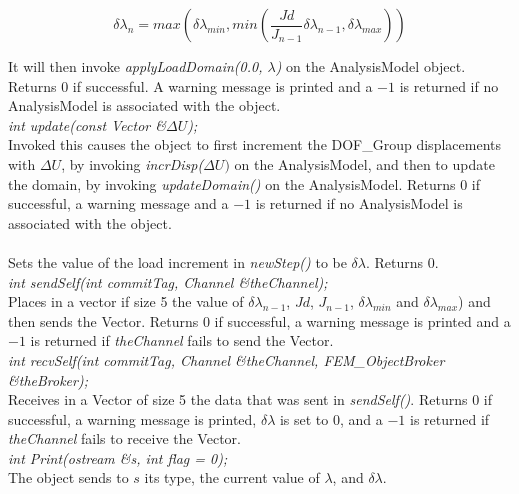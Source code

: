 \[ 
\delta \lambda_n = max \left( \delta \lambda_{min}, min \left(
\frac{Jd}{J_{n-1}} \delta \lambda_{n-1}, \delta \lambda_{max} \right) \right)
\]

\noindent It will then invoke
{\em applyLoadDomain(0.0, $\lambda$)} on the AnalysisModel
object. Returns $0$ if successful. A warning message is printed and a
$-1$ is returned if no AnalysisModel is associated with the object. \\

{\em int update(const Vector \&$\Delta U$);} \\
Invoked this causes the object to first increment the DOF\_Group
displacements with $\Delta U$, by invoking {\em incrDisp($\Delta U)$}
on the AnalysisModel, and then to update the domain, by invoking {\em
updateDomain()} on the AnalysisModel. Returns $0$ if successful, a
warning message and a $-1$ is returned if no AnalysisModel is
associated with the object. \\


 \\
Sets the value of the load increment in {\em newStep()} to be $\delta
\lambda$. Returns $0$.\\

{\em int sendSelf(int commitTag, Channel \&theChannel); } \\ 
Places in a vector if size 5 the value of $\delta \lambda_{n-1}$,
$Jd$, $J_{n-1}$, $\delta \lambda_{min}$ and $\delta \lambda_{max}$)
and then sends the Vector. Returns $0$ if successful, a warning
message is printed and a $-1$ is returned if {\em theChannel} fails to
send the Vector. \\ 

{\em int recvSelf(int commitTag, Channel \&theChannel, 
FEM\_ObjectBroker \&theBroker); } \\ 
Receives in a Vector of size 5 the data that was sent in {\em sendSelf()}.
Returns $0$ if successful, a warning message is printed, $\delta
\lambda$ is set to $0$, and a $-1$ is returned if {\em theChannel} 
fails to receive the Vector.\\

{\em int Print(ostream \&s, int flag = 0);}\\
The object sends to $s$ its type, the current value of $\lambda$, and
$\delta \lambda$. 
